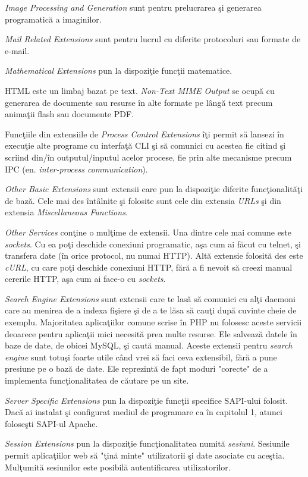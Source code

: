 \textit{Image Processing and Generation} sunt pentru
prelucrarea şi generarea programatică a imaginilor.

\textit{Mail Related Extensions} sunt pentru
lucrul cu diferite protocoluri sau formate de e-mail.

\textit{Mathematical Extensions} pun la dispoziţie
funcţii matematice.

HTML este un limbaj bazat pe text.
\textit{Non-Text MIME Output} se ocupă cu
generarea de documente sau resurse în alte formate pe
lângă text precum animaţii flash sau documente PDF.

Funcţiile din extensiile de \textit{Process Control Extensions}
îţi permit să lansezi în execuţie alte programe cu interfaţă
CLI şi să
comunici cu acestea fie citind şi scriind din/în outputul/inputul
acelor procese, fie prin alte mecanisme precum IPC
(en. \textsl{inter-process communication}).

\textit{Other Basic Extensions} sunt extensii care pun
la dispoziţie diferite funcţionalităţi de bază.
Cele mai des întâlnite şi folosite sunt cele din
extensia \textit{URLs} şi din extensia \textit{Miscellaneous Functions}.

\textit{Other Services} conţine o mulţime de extensii. Una dintre
cele mai comune este \textit{sockets}. Cu ea poţi deschide
conexiuni programatic, aşa cum ai făcut cu telnet, şi transfera
date (în orice protocol, nu numai HTTP). Altă extensie folosită des
este \textit{cURL}, cu care poţi deschide conexiuni HTTP, fără
a fi nevoit să creezi manual cererile HTTP, aşa cum ai face-o cu
\textit{sockets}.

\textit{Search Engine Extensions} sunt extensii care te lasă
să comunici cu alţi daemoni care au menirea de a indexa
fişiere şi de a te lăsa să cauţi după cuvinte cheie de
exemplu. Majoritatea aplicaţiilor comune scrise în PHP
nu folosesc aceste servicii deoarece pentru aplicaţii mici
necesită prea multe resurse. Ele salvează datele în baze de
date, de obicei MySQL, şi caută manual. Aceste extensii
pentru \textit{search engine} sunt totuşi foarte
utile când vrei să faci ceva extensibil, fără a pune
presiune pe o bază de date. Ele reprezintă de fapt moduri "corecte"
de a implementa funcţionalitatea de căutare pe un site.

\textit{Server Specific Extensions} pun la dispoziţie
funcţii specifice SAPI-ului folosit. Dacă ai instalat
şi configurat mediul de programare ca în capitolul 1,
atunci foloseşti SAPI-ul Apache.

\textit{Session Extensions} pun la dispoziţie funcţionalitatea
numită \textsl{sesiuni}. Sesiunile permit aplicaţiilor web
să "ţină minte" utilizatorii şi date asociate cu aceştia.
Mulţumită sesiunilor este posibilă autentificarea utilizatorilor.

